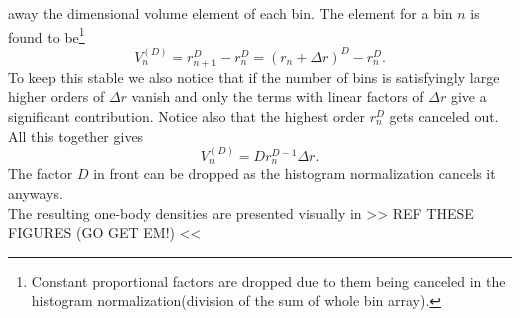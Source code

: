     away the dimensional volume element of each bin. The element for a bin $n$
    is found to be\footnote{Constant proportional factors are dropped due to
    them being canceled in the histogram normalization(division of the sum of
    whole bin array).}
        \begin{equation}
            V^{(D)}_n = r^D_{n+1} - r^D_n = (r_n+\Delta r)^D - r^D_n.
        \end{equation}
    To keep this stable we also notice that if the number of bins is
    satisfyingly large higher orders of $\Delta r$ vanish and only the terms
    with linear factors of $\Delta r$ give a significant contribution. Notice
    also that the highest order $r^D_n$ gets canceled out. All this together
    gives
        \begin{equation}
            V^{(D)}_n = Dr_n^{D-1}\Delta r.
        \end{equation}
    The factor $D$ in front can be dropped as the histogram normalization
    cancels it anyways. \\
    The resulting one-body densities are presented visually in >> REF THESE
    FIGURES (GO GET EM!) <<
